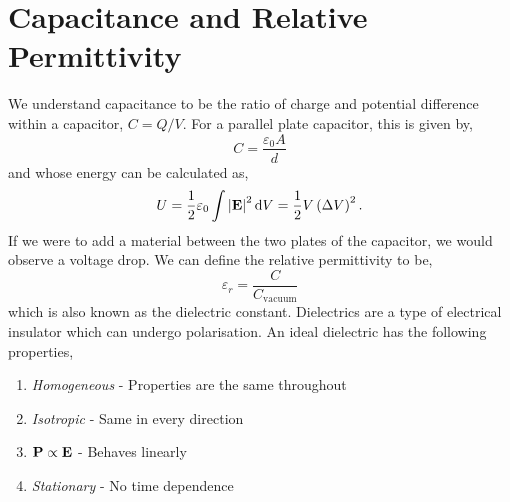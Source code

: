 \documentclass{book}
\begin{document}
\section{Capacitance and Relative Permittivity}
We understand capacitance to be the ratio of charge and potential difference within a capacitor, $C = Q/V$. For a parallel plate capacitor, this is given by,
\begin{equation}
	C = \frac{\varepsilon_0 A}{d}
\end{equation}
and whose energy can be calculated as,
\begin{equation}
	U = \frac{1}{2}\varepsilon_0\int \left|\vb{E}\right|^2\dd{V} = \frac{1}{2}V\left(\Delta V\right)^2.
\end{equation}
If we were to add a material between the two plates of the capacitor, we would observe a voltage drop. We can define the relative permittivity to be,
\begin{equation}
	\varepsilon_r = \frac{C}{C_{\text{vacuum}}}
\end{equation}
which is also known as the dielectric constant. Dielectrics are a type of electrical insulator which can undergo polarisation. An ideal dielectric has the following properties,
\begin{enumerate}
	\item \textit{Homogeneous} - Properties are the same throughout
	\item \textit{Isotropic} - Same in every direction
	\item \textit{$\vb{P} \propto \vb{E}$} - Behaves linearly
	\item \textit{Stationary} - No time dependence
\end{enumerate}
\end{document}
